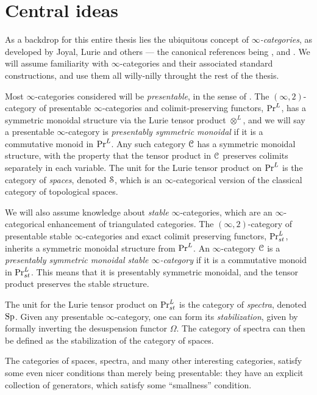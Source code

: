 
\section{Central ideas}
\label{ch1:sec:Central-ideas}

As a backdrop for this entire thesis lies the ubiquitous concept of \emph{$\infty$-categories}, as developed by Joyal, Lurie and others --- the canonical references being \cite{joyal_02}, \cite{lurie_09} and \cite{Lurie_HA}. We will assume familiarity with $\infty$-categories and their associated standard constructions, and use them all willy-nilly throught the rest of the thesis. 

Most $\infty$-categories considered will be \emph{presentable}, in the sense of \cite[Chapter 5]{lurie_09}. The $(\infty, 2)$-category of presentable $\infty$-categories and colimit-preserving functors, $\mathrm{Pr}^L$, has a symmetric monoidal structure via the Lurie tensor product $\otimes^L$, and we will say a presentable $\infty$-category is \emph{presentably symmetric monoidal} if it is a commutative monoid in $\mathrm{Pr}^L$. Any such category $\EuScript{C}$ has a symmetric monoidal structure, with the property that the tensor product in $\EuScript{C}$ preserves colimits separately in each variable. The unit for the Lurie tensor product on $\mathrm{Pr}^L$ is the category of \emph{spaces}, denoted $\EuScript{S}$, which is an $\infty$-categorical version of the classical category of topological spaces. 

We will also assume knowledge about \emph{stable} $\infty$-categories, which are an $\infty$-categorical enhancement of triangulated categories. The $(\infty, 2)$-category of presentable stable $\infty$-categories and exact colimit preserving functors, $\mathrm{Pr}_{st}^L$, inherits a symmetric monoidal structure from $\mathrm{Pr}^L$. An $\infty$-category $\EuScript{C}$ is a \emph{presentably symmetric monoidal stable $\infty$-category} if it is a commutative monoid in $\mathrm{Pr}_{st}^L$. This means that it is presentably symmetric monoidal, and the tensor product preserves the stable structure. 

The unit for the Lurie tensor product on $\mathrm{Pr}_{st}^L$ is the category of \emph{spectra}, denoted $\mathrm{Sp}$. Given any presentable $\infty$-category, one can form its \emph{stabilization}, given by formally inverting the desuspension functor $\Omega$. The category of spectra can then be defined as the stabilization of the category of spaces. 

The categories of spaces, spectra, and many other interesting categories, satisfy some even nicer conditions than merely being presentable: they have an explicit collection of generators, which satisfy some ``smallness'' condition. 

